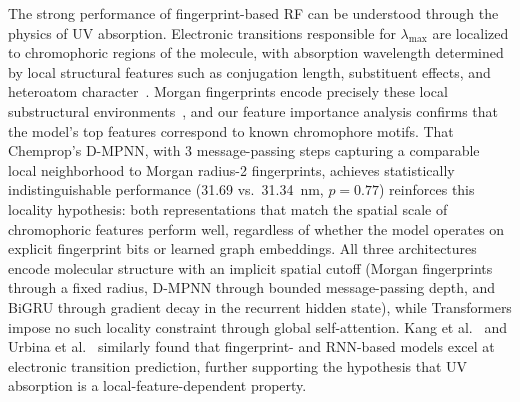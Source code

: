 \documentclass[journal=jcisd8,manuscript=article]{achemso}
\begin{document}
The strong performance of fingerprint-based RF can be understood through the physics of UV absorption.
Electronic transitions responsible for $\lambda_{\max}$ are localized to chromophoric regions of the molecule, with absorption wavelength determined by local structural features such as conjugation length, substituent effects, and heteroatom character~\cite{flemingMolecular2010, reichardt2011solvents}.
Morgan fingerprints encode precisely these local substructural environments~\cite{rogers2010extended}, and our feature importance analysis confirms that the model's top features correspond to known chromophore motifs.
That Chemprop's D-MPNN, with 3 message-passing steps capturing a comparable local neighborhood to Morgan radius-2 fingerprints, achieves statistically indistinguishable performance (31.69 vs.\ 31.34~nm, $p = 0.77$) reinforces this locality hypothesis: both representations that match the spatial scale of chromophoric features perform well, regardless of whether the model operates on explicit fingerprint bits or learned graph embeddings.
All three architectures encode molecular structure with an implicit spatial cutoff (Morgan fingerprints through a fixed radius, D-MPNN through bounded message-passing depth, and BiGRU through gradient decay in the recurrent hidden state), while Transformers impose no such locality constraint through global self-attention.
Kang et al.~\cite{kang2020prediction} and Urbina et al.~\cite{beard2022uvadvisor} similarly found that fingerprint- and RNN-based models excel at electronic transition prediction, further supporting the hypothesis that UV absorption is a local-feature-dependent property.
\end{document}
